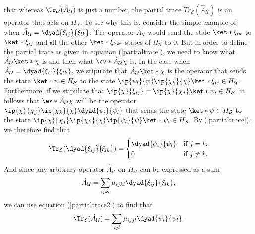 \documentclass[12pt]{report}
\begin{document}
% 
    that whereas $\Tr_\mathcal{U}(\hat{A}_\mathcal{U})$ is just a number, the partial trace $Tr_\mathcal{E}(\hat{A}_\mathcal{U})$  is an operator that acts on $H_\mathcal{S}$. To see why this is, consider the simple example of when $\hat{A}_\mathcal{U}=\dyad{\xi_{ij}}{\xi_{lk}}$. The operator $\hat{A}_\mathcal{U}$ would send the state $\ket*{\xi_{lk}}$ to $\ket*{\xi_{ij}}$ and all the other $\ket*{\xi_{l'k'}}$-states of $H_\mathcal{U}$ to $0$. But in order to define the partial trace as given in equation (\ref{partialtrace}), we need to know what $\hat{A}_\mathcal{U}\ket*{\chi}$ is and then what $\ev*{\hat{A}_\mathcal{U}}{\chi}$ is. In the case when $\hat{A}_\mathcal{U}=\dyad{\xi_{ij}}{\xi_{lk}}$, we stipulate that $\hat{A}_\mathcal{U}\ket*{\chi}$ is the operator that sends the state $\ket*{\psi}\in H_\mathcal{S}$ to the state $\ip{\psi_l}{\psi}\ip{\chi_k}{\chi}\ket*{\xi_{ij}}\in H_\mathcal{U}$.  Furthermore, if we stipulate that $\ip{\chi}{\xi_{ij}}=\ip{\chi}{\chi_j}\ket*{\psi_i}\in H_\mathcal{S}$, it follows that $\ev*{\hat{A}_\mathcal{U}}{\chi}$ will be the operator $\ip{\chi}{\chi_j}\ip{\chi_k}{\chi}\dyad{\psi_i}{\psi_l}$ that sends  the state $\ket*{\psi}\in H_\mathcal{S}$ to the state  $\ip{\chi}{\chi_j}\ip{\chi_k}{\chi}\ip{\psi_l}{\psi}\ket*{\psi_i}\in H_\mathcal{S}.$ By (\ref{partialtrace}), we therefore find that
    \begin{equation} \label{partialtrace2}
    \Tr_\mathcal{E}(\dyad{\xi_{ij}}{\xi_{lk}})=
    \begin{cases} \dyad{\psi_i}{\psi_l} & \text{if $j=k$,} \\
    0 & \text{if $j\neq k$}.
    \end{cases}
    \end{equation}
    And since any arbitrary  operator $\hat{A}_\mathcal{U}$ on $H_\mathcal{U}$ can be expressed as a sum 
    \begin{equation}\label{Au}
    \hat{A}_\mathcal{U}=\sum_{ijkl}\mu_{ijkl}\dyad{\xi_{ij}}{\xi_{lk}},
    \end{equation}
    we can use equation (\ref{partialtrace2}) to find that 
     \begin{equation}\label{AuPartialTrace}
     \Tr_\mathcal{E}(\hat{A}_\mathcal{U})=\sum_{ijl}\mu_{ijjl}\dyad{\psi_i}{\psi_l}.
     \end{equation}
    
\end{document}

